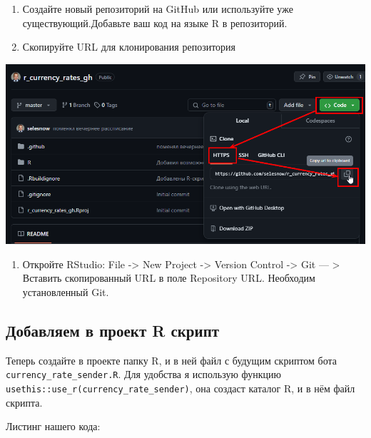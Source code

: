 \documentclass[
]{book}
\providecommand{\tightlist}{%
  \setlength{\itemsep}{0pt}\setlength{\parskip}{0pt}}
\begin{document}
\begin{enumerate}
\def\labelenumi{\arabic{enumi}.}
\tightlist
\item
  Создайте новый репозиторий на GitHub или используйте уже существующий.Добавьте ваш код на языке R в репозиторий.
\item
  Скопируйте URL для клонирования репозитория
\end{enumerate}

\includegraphics{img/1-gh-action-1.webp}

\begin{enumerate}
\def\labelenumi{\arabic{enumi}.}
\setcounter{enumi}{2}
\tightlist
\item
  Откройте RStudio: File -\textgreater{} New Project -\textgreater{} Version Control -\textgreater{} Git --- \textgreater{} Вставить скопированный URL в поле Repository URL. Необходим установленный Git.
\end{enumerate}

\subsection{Добавляем в проект R скрипт}\label{ux434ux43eux431ux430ux432ux43bux44fux435ux43c-ux432-ux43fux440ux43eux435ux43aux442-r-ux441ux43aux440ux438ux43fux442}

Теперь создайте в проекте папку R, и в ней файл с будущим скриптом бота \texttt{currency\_rate\_sender.R}. Для удобства я использую функцию \texttt{usethis::use\_r(\textquotesingle{}currency\_rate\_sender\textquotesingle{})}, она создаст каталог R, и в нём файл скрипта.

Листинг нашего кода:
\end{document}
